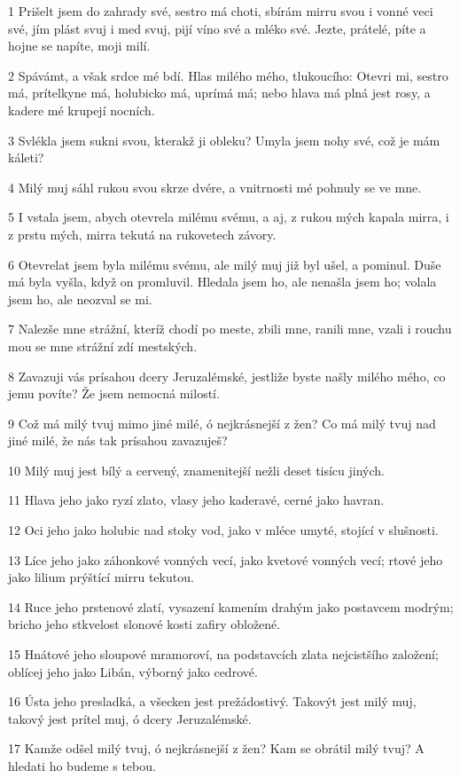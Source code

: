\par 1 Prišelt jsem do zahrady své, sestro má choti, sbírám mirru svou i vonné veci své, jím plást svuj i med svuj, pijí víno své a mléko své. Jezte, prátelé, píte a hojne se napíte, moji milí.
\par 2 Spávámt, a však srdce mé bdí. Hlas milého mého, tlukoucího: Otevri mi, sestro má, prítelkyne má, holubicko má, uprímá má; nebo hlava má plná jest rosy, a kadere mé krupejí nocních.
\par 3 Svlékla jsem sukni svou, kterakž ji obleku? Umyla jsem nohy své, což je mám káleti?
\par 4 Milý muj sáhl rukou svou skrze dvére, a vnitrnosti mé pohnuly se ve mne.
\par 5 I vstala jsem, abych otevrela milému svému, a aj, z rukou mých kapala mirra, i z prstu mých, mirra tekutá na rukovetech závory.
\par 6 Otevrelat jsem byla milému svému, ale milý muj již byl ušel, a pominul. Duše má byla vyšla, když on promluvil. Hledala jsem ho, ale nenašla jsem ho; volala jsem ho, ale neozval se mi.
\par 7 Nalezše mne strážní, kteríž chodí po meste, zbili mne, ranili mne, vzali i rouchu mou se mne strážní zdí mestských.
\par 8 Zavazuji vás prísahou dcery Jeruzalémské, jestliže byste našly milého mého, co jemu povíte? Že jsem nemocná milostí.
\par 9 Což má milý tvuj mimo jiné milé, ó nejkrásnejší z žen? Co má milý tvuj nad jiné milé, že nás tak prísahou zavazuješ?
\par 10 Milý muj jest bílý a cervený, znamenitejší nežli deset tisícu jiných.
\par 11 Hlava jeho jako ryzí zlato, vlasy jeho kaderavé, cerné jako havran.
\par 12 Oci jeho jako holubic nad stoky vod, jako v mléce umyté, stojící v slušnosti.
\par 13 Líce jeho jako záhonkové vonných vecí, jako kvetové vonných vecí; rtové jeho jako lilium prýštící mirru tekutou.
\par 14 Ruce jeho prstenové zlatí, vysazení kamením drahým jako postavcem modrým; bricho jeho stkvelost slonové kosti zafiry obložené.
\par 15 Hnátové jeho sloupové mramoroví, na podstavcích zlata nejcistšího založení; oblícej jeho jako Libán, výborný jako cedrové.
\par 16 Ústa jeho presladká, a všecken jest prežádostivý. Takovýt jest milý muj, takový jest prítel muj, ó dcery Jeruzalémské.
\par 17 Kamže odšel milý tvuj, ó nejkrásnejší z žen? Kam se obrátil milý tvuj? A hledati ho budeme s tebou.

